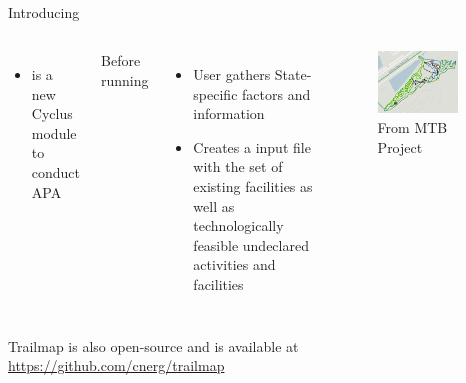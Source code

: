 \subsection{\Trailmap}
\begin{frame}{Introducing \Trailmap}
    \begin{columns}
     \begin{itemize}
         \item \Trailmap is a new Cyclus module to conduct APA
     \end{itemize}
     \bigskip
    Before running \Trailmap
    \begin{itemize}
        \item User gathers State-specific factors and information
        \item Creates a \Cyclus input file with the set of existing facilities as well as technologically feasible undeclared activities and facilities
    \end{itemize}
    \begin{figure}
        \centering
        \includegraphics[width=0.85\textwidth]{images/Trailmap.png}
        \caption{From MTB Project}
        \label{fig:mtb}
    \end{figure}
    \end{columns}
    \bigskip
   Trailmap is also open-source and is available at \href{https://github.com/cnerg/trailmap}{https://github.com/cnerg/trailmap}
\end{frame}

